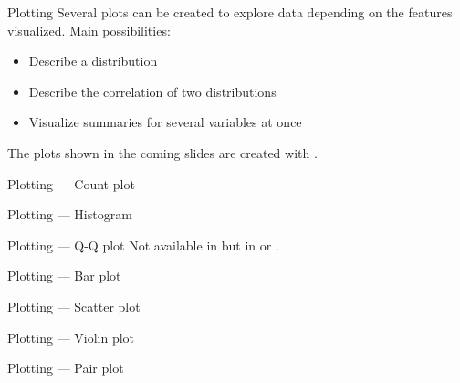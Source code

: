 \begin{frame}{Plotting}
  Several plots can be created to explore data depending on the features visualized. Main possibilities:

  \begin{itemize}
  \item Describe a distribution
  \item Describe the correlation of two distributions
  \item Visualize summaries for several variables at once
  \end{itemize}
  The plots shown in the coming slides are created with
  .
\end{frame}

\begin{frame}{Plotting — Count plot}
\end{frame}

\begin{frame}{Plotting — Histogram}
\end{frame}

\begin{frame}{Plotting — Q-Q plot}
  Not available in 
  but in
  or
  .
\end{frame}

\begin{frame}{Plotting — Bar plot}
\end{frame}

\begin{frame}{Plotting — Scatter plot}
\end{frame}

\begin{frame}{Plotting — Violin plot}
\end{frame}

\begin{frame}{Plotting — Pair plot}
\end{frame}

